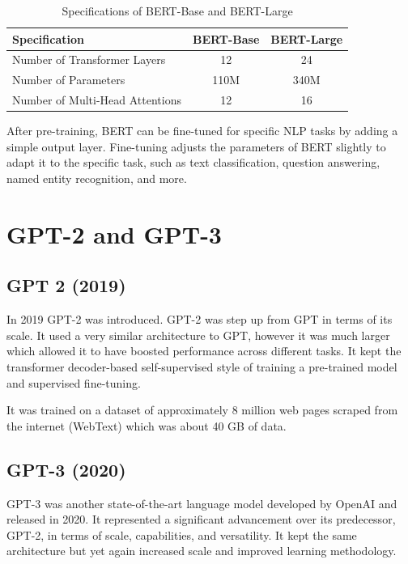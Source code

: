 \begin{table}[H]
\centering
\renewcommand{\arraystretch}{1.5}
\setlength{\tabcolsep}{10pt}
\begin{tabular}{@{}lcc@{}}
\toprule
\textbf{Specification}           & \textbf{BERT-Base} & \textbf{BERT-Large} \\ \midrule
Number of Transformer Layers     & 12                 & 24                  \\
Number of Parameters             & 110M               & 340M                \\
Number of Multi-Head Attentions  & 12                 & 16                  \\ \bottomrule
\end{tabular}
\caption{Specifications of BERT-Base and BERT-Large}
\label{tab:bert_specs}
\end{table}


After pre-training, BERT can be fine-tuned for specific NLP tasks by adding a simple output layer. Fine-tuning adjusts the parameters of BERT slightly to adapt it to the specific task, such as text classification, question answering, named entity recognition, and more.

\section{GPT-2 and GPT-3}

\subsection{GPT 2 (2019)}
In 2019 GPT-2 was introduced. GPT-2 was step up from GPT in terms of its scale. It used a very similar architecture to GPT, however it was much larger which allowed it to have boosted performance across different tasks. It kept the transformer decoder-based self-supervised style of training a pre-trained model and supervised fine-tuning.

It was trained on a dataset of approximately 8 million web pages scraped from the internet (WebText) which was about 40 GB of data.

\subsection{GPT-3 (2020)}
GPT-3 was another state-of-the-art language model developed by OpenAI and released in 2020. It represented a significant advancement over its predecessor, GPT-2, in terms of scale, capabilities, and versatility. It kept the same architecture but yet again increased scale and improved learning methodology.

